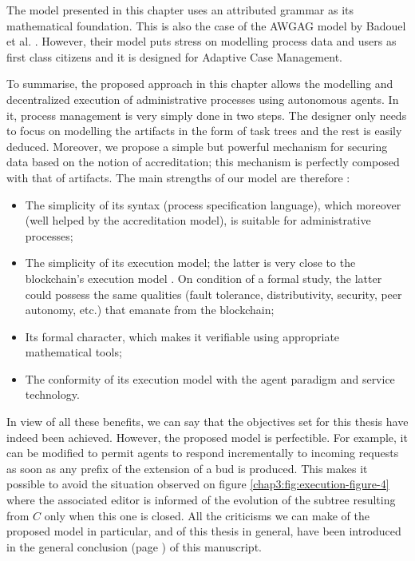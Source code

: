 The model presented in this chapter uses an attributed grammar as its mathematical foundation. This is also the case of the AWGAG model by Badouel et al. \citeyearpar{badouel14, badouel2015active}. However, their model puts stress on modelling process data and users as first class citizens and it is designed for Adaptive Case Management.

To summarise, the proposed approach in this chapter allows the modelling and decentralized execution of administrative processes using autonomous agents. In it, process management is very simply done in two steps. The designer only needs to focus on modelling the artifacts in the form of task trees and the rest is easily deduced. Moreover, we propose a simple but powerful mechanism for securing data based on the notion of accreditation; this mechanism is perfectly composed with that of artifacts. The main strengths of our model are therefore : 
\begin{itemize}
	\item The simplicity of its syntax (process specification language), which moreover (well helped by the accreditation model), is suitable for administrative processes;
	\item The simplicity of its execution model; the latter is very close to the blockchain's execution model \cite{hull2017blockchain, mendling2018blockchains}. On condition of a formal study, the latter could possess the same qualities (fault tolerance, distributivity, security, peer autonomy, etc.) that emanate from the blockchain;
	\item Its formal character, which makes it verifiable using appropriate mathematical tools;
	\item The conformity of its execution model with the agent paradigm and service technology.
\end{itemize}
In view of all these benefits, we can say that the objectives set for this thesis have indeed been achieved. However, the proposed model is perfectible. For example, it can be modified to permit agents to respond incrementally to incoming requests as soon as any prefix of the extension of a bud is produced. This makes it possible to avoid the situation observed on figure \ref{chap3:fig:execution-figure-4} where the associated editor is informed of the evolution of the subtree resulting from $C$ only when this one is closed. All the criticisms we can make of the proposed model in particular, and of this thesis in general, have been introduced in the general conclusion (page \pageref{chap5:general-conclusion}) of this manuscript.



